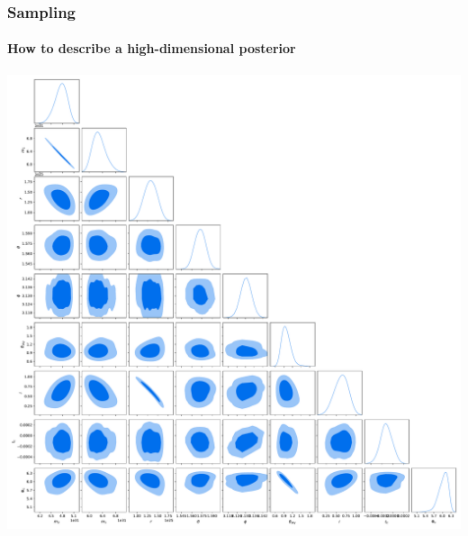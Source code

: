 \documentclass[%
]{beamer}
\begin{document}
\begin{frame}
    \frametitle{Sampling}
    \framesubtitle{How to describe a high-dimensional posterior}
    \centerline{%
        \includegraphics[height=0.65\textwidth]{./figures/ligo_full.pdf}
    }
\end{frame}
%
%
\end{document}
